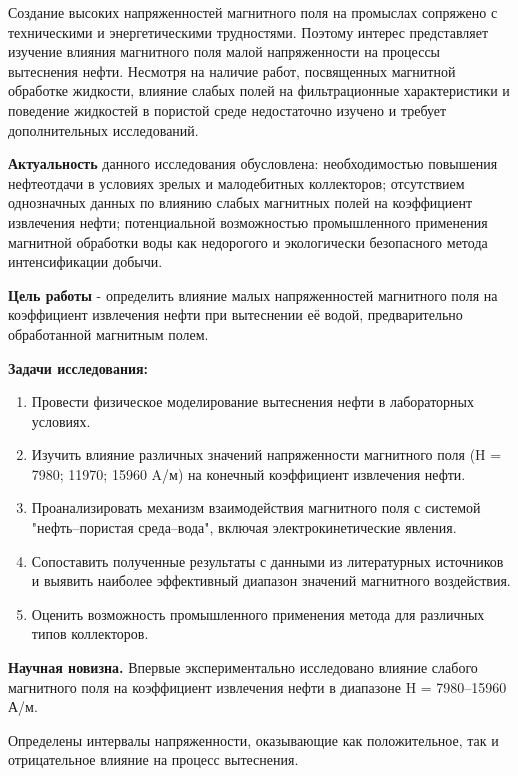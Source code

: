 {{Создание высоких напряженностей магнитного поля на промыслах сопряжено с
техническими и энергетическими трудностями. Поэтому интерес представляет
изучение влияния магнитного поля малой напряженности на процессы
вытеснения нефти. Несмотря на наличие работ, посвященных магнитной
обработке жидкости, влияние слабых полей на фильтрационные
характеристики и поведение жидкостей в пористой среде недостаточно
изучено и требует дополнительных исследований.

{\bfseries Актуальность} данного исследования обусловлена: необходимостью
повышения нефтеотдачи в условиях зрелых и малодебитных коллекторов;
отсутствием однозначных данных по влиянию слабых магнитных полей на
коэффициент извлечения нефти; потенциальной возможностью промышленного
применения магнитной обработки воды как недорогого и экологически
безопасного метода интенсификации добычи.

{\bfseries Цель работы} - определить влияние малых напряженностей
магнитного поля на коэффициент извлечения нефти при вытеснении её водой,
предварительно обработанной магнитным полем.

{\bfseries Задачи исследования:}

\begin{enumerate}
\def\labelenumi{\arabic{enumi}.}
\item
  Провести физическое моделирование вытеснения нефти в лабораторных
  условиях.
\item
  Изучить влияние различных значений напряженности магнитного поля (H =
  7980; 11970; 15960 A/м) на конечный коэффициент извлечения нефти.
\item
  Проанализировать механизм взаимодействия магнитного поля с системой
  "нефть--пористая среда--вода", включая электрокинетические явления.
\item
  Сопоставить полученные результаты с данными из литературных источников
  и выявить наиболее эффективный диапазон значений магнитного
  воздействия.
\item
  Оценить возможность промышленного применения метода для различных
  типов коллекторов.
\end{enumerate}

{\bfseries Научная новизна.} Впервые экспериментально исследовано влияние
слабого магнитного поля на коэффициент извлечения нефти в диапазоне H =
7980--15960 А/м.

Определены интервалы напряженности, оказывающие как положительное, так и
отрицательное влияние на процесс вытеснения.

}}
